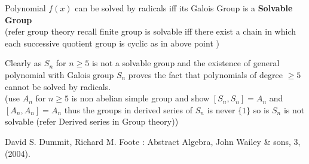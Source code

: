 \documentclass[11pt]{extarticle}
\newcommand{\snote}[1]{{\footnotesize(#1)}}
\newcommand{\tbx}[2][]{
\begin{tcolorbox}[enhanced,breakable,size=small,colback=black!2!white,title={#1},arc is angular, arc=1.5mm,drop fuzzy shadow]
	#2
\end{tcolorbox}
}
\begin{document}
\begin{multicols}{2}
\tbx[Solvablity theorem ]{  Polynomial $ f(x) $ can be solved by radicals iff its Galois Group is a \textbf{Solvable Group} \\
\snote{refer group theory recall finite group is solvable iff there exist a chain in which each successive quotient group is cyclic as in above point }}
\tbx[Insovablity of quintic and higher degree polynomial]{ Clearly as $ S_n $ for $ n\geq 5 $ is not a solvable group and the existence of general polynomial with Galois group $ S_n $ proves the fact that polynomials of degree $ \geq 5 $ cannot be solved by radicals.\\
\snote{use $ A_n $ for $ n\geq 5 $ is non abelian simple group and show $ [S_n,S_n]=A_n $ and $ [A_n,A_n] =A_n$ thus the groups in derived series of $ S_n $ is never $ \{1\} $ so is $ S_n $ is not solvable (refer Derived series in Group theory)} }
\newcolumn
\begin{thebibliography}{9}
 	David S. Dummit, Richard M. Foote : Abstract Algebra, John Wailey \& sons, 3, (2004).
\end{thebibliography}
	
	\end{multicols}
	
\end{document}
